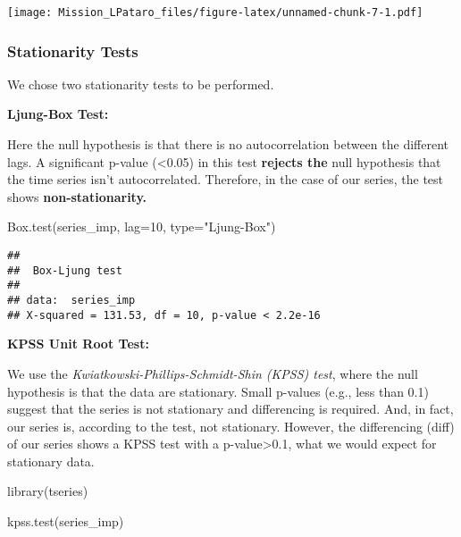 \documentclass[
]{article}
\newenvironment{Shaded}{\begin{snugshade}}{\end{snugshade}}
\newcommand{\AttributeTok}[1]{\textcolor[rgb]{0.77,0.63,0.00}{#1}}
\newcommand{\DecValTok}[1]{\textcolor[rgb]{0.00,0.00,0.81}{#1}}
\newcommand{\FunctionTok}[1]{\textcolor[rgb]{0.00,0.00,0.00}{#1}}
\newcommand{\NormalTok}[1]{#1}
\newcommand{\StringTok}[1]{\textcolor[rgb]{0.31,0.60,0.02}{#1}}
\begin{document}
\texttt{[image: Mission\_LPataro\_files/figure-latex/unnamed-chunk-7-1.pdf]}

\hypertarget{stationarity-tests}{%
\subsubsection{Stationarity Tests}\label{stationarity-tests}}

We chose two stationarity tests to be performed.

\textbf{Ljung-Box Test:}

Here the null hypothesis is that there is no autocorrelation between the
different lags. A significant p-value (\textless0.05) in this test
\textbf{rejects the} null hypothesis that the time series isn't
autocorrelated. Therefore, in the case of our series, the test shows
\textbf{non-stationarity.}

\begin{Shaded}
\begin{Highlighting}[]
\FunctionTok{Box.test}\NormalTok{(series\_imp, }\AttributeTok{lag=}\DecValTok{10}\NormalTok{, }\AttributeTok{type=}\StringTok{"Ljung{-}Box"}\NormalTok{)}
\end{Highlighting}
\end{Shaded}

\begin{verbatim}
## 
##  Box-Ljung test
## 
## data:  series_imp
## X-squared = 131.53, df = 10, p-value < 2.2e-16
\end{verbatim}

\textbf{KPSS Unit Root Test:}

We use the \emph{Kwiatkowski-Phillips-Schmidt-Shin (KPSS) test}, where
the null hypothesis is that the data are stationary. Small p-values
(e.g., less than 0.1) suggest that the series is not stationary and
differencing is required. And, in fact, our series is, according to the
test, not stationary. However, the differencing (diff) of our series
shows a KPSS test with a p-value\textgreater0.1, what we would expect
for stationary data.

\begin{Shaded}
\begin{Highlighting}[]
\FunctionTok{library}\NormalTok{(tseries)}
\end{Highlighting}
\end{Shaded}

\begin{Shaded}
\begin{Highlighting}[]
\FunctionTok{kpss.test}\NormalTok{(series\_imp)}
\end{Highlighting}
\end{Shaded}
\end{document}
